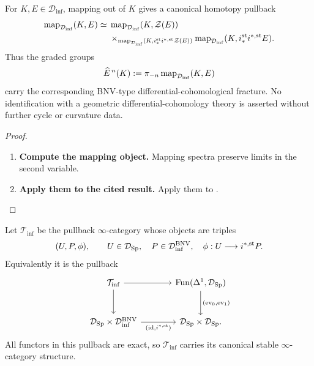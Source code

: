 \begin{corollary}
\label{cor:stable-bnv-differential-cohomology-pullback}
For \(K,E\in\mathcal D_{\inf}\), mapping out of \(K\) gives a canonical
homotopy pullback
\[
\begin{aligned}
    \operatorname{map}_{\mathcal D_{\inf}}(K,E)
    \simeq{}&
    \operatorname{map}_{\mathcal D_{\inf}}(K,\mathcal Z(E))
    \\
    &\times_{
        \operatorname{map}_{\mathcal D_{\inf}}
        (K,i_*^{\mathrm{st}}i^{*,\mathrm{st}}\mathcal Z(E))
    }
    \operatorname{map}_{\mathcal D_{\inf}}
        (K,i_*^{\mathrm{st}}i^{*,\mathrm{st}}E).
\end{aligned}
\]
Thus the graded groups
\[
    \widehat E^{\,n}(K)
    :=
    \pi_{-n}\operatorname{map}_{\mathcal D_{\inf}}(K,E)
\]
carry the corresponding BNV-type differential-cohomological fracture. No
identification with a geometric differential-cohomology theory is asserted
without further cycle or curvature data.
\end{corollary}

\begin{proof}
\leavevmode
\begin{enumerate}[label=\textup{(\arabic*)}]
    \item \textbf{Compute the mapping object.}
    Mapping spectra preserve limits in the second variable.

    \item \textbf{Apply them to the cited result.}
    Apply them to .
\end{enumerate}
\end{proof}

\begin{definition}
\label{def:stable-bnv-characteristic-category}
Let \(\mathcal T_{\inf}\) be the pullback \(\infty\)-category whose objects
are triples
\[
    (U,P,\phi),
    \qquad
    U\in\mathcal D_{\operatorname{Sp}},
    \quad
    P\in\mathcal D_{\inf}^{\mathrm{BNV}},
    \quad
    \phi:U\longrightarrow i^{*,\mathrm{st}}P.
\]
Equivalently it is the pullback
\[
\begin{tikzcd}[column sep=large,row sep=large]
    \mathcal T_{\inf} \arrow[r] \arrow[d]
        & \Fun(\Delta^1,\mathcal D_{\Sp})
          \arrow[d,"{(\operatorname{ev}_0,\operatorname{ev}_1)}"]
    \\
    \mathcal D_{\Sp}\times\mathcal D_{\inf}^{\mathrm{BNV}}
        \arrow[r,"{(\id,i^{*,\mathrm{st}})}"']
        & \mathcal D_{\Sp}\times\mathcal D_{\Sp}.
\end{tikzcd}
\]
All functors in this pullback are exact, so \(\mathcal T_{\inf}\) carries its
canonical stable \(\infty\)-category structure.
\end{definition}

